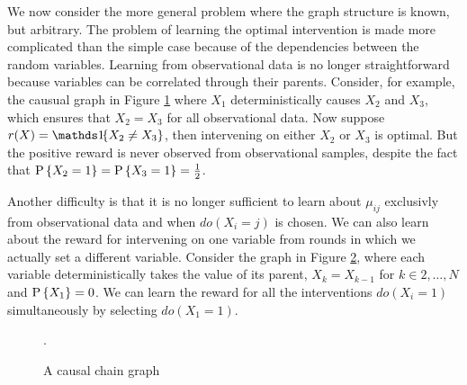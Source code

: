 
\newcommand{\calP}{\mathcal P}
\newcommand{\x}{\boldsymbol{x}}
\newcommand{\Ps}{\operatorname{P}}

We now consider the more general problem where the graph structure is known, but arbitrary.
The problem of learning the optimal intervention is made more complicated than the simple case because of 
the dependencies between the random variables. Learning from observational data is no longer straightforward
because variables can be correlated through their parents. Consider, for example, the causual graph in Figure \ref{fig:causalStructure_confounded} where $X_1$
deterministically causes $X_2$ and $X_3$, which ensures that $X_2 = X_3$ for all observational data. Now suppose $r(X) = \ind{X_2 \neq X_3}$,
then intervening on either $X_2$ or $X_3$ is optimal. But the positive reward is never observed from observational samples, despite
the fact that $\P{X_2 = 1} = \P{X_3 = 1} = \frac{1}{2}$.
\begin{figure}[h]
\centering
{}
\caption{}\label{fig:causalStructure_confounded}
\end{figure} 

Another difficulty is that it is no longer sufficient to learn about $\mu_{ij}$ exclusivly from observational data and when $do(X_i = j)$ is chosen.
We can also learn about the reward for intervening on one variable from rounds in which we actually set a different variable.
Consider the graph in Figure \ref{fig:causalchain}, where each variable deterministically takes the value of its parent, $X_k = X_{k-1}$ 
for $k\in {2,\ldots,N}$ and $\P{X_1} = 0$. 
We can learn the reward for all the interventions $do(X_i = 1)$ simultaneously by selecting $do(X_1 = 1)$. 

\begin{figure}[h]
\centering
\caption{A causal chain graph}.
\label{fig:causalchain}
\end{figure} 




